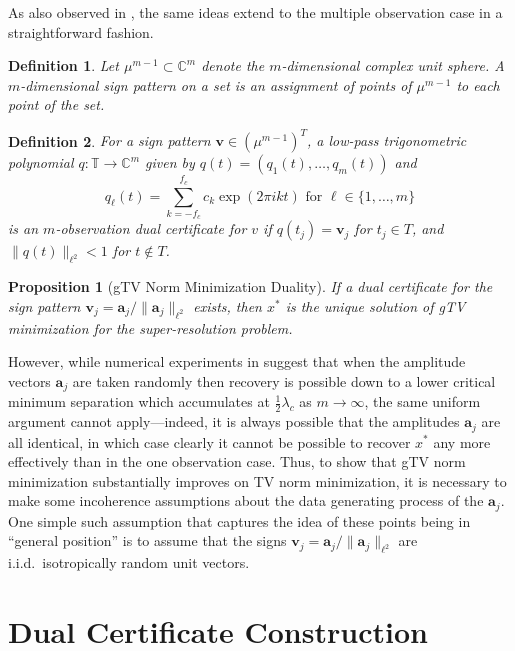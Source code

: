 \documentclass[11pt]{article}
\newcommand{\TT}{\mathbb{T}}
\newcommand{\CC}{\mathbb{C}}
\newcommand{\ba}{\bm a}
\newcommand{\bv}{\bm v}
\newtheorem{definition}{Definition}
\newtheorem{proposition}{Proposition}
\begin{document}
As also observed in \cite{fernandez2016super}, the same ideas extend to the multiple observation case in a straightforward fashion.
\begin{definition}
    Let $\mu^{m - 1} \subset \CC^m$ denote the $m$-dimensional complex unit sphere.
    A \emph{$m$-dimensional sign pattern} on a set is an assignment of points of $\mu^{m - 1}$ to each point of the set.
\end{definition}
\begin{definition}
    For a sign pattern $\bv \in (\mu^{m - 1})^T$, a low-pass trigonometric polynomial $q: \TT \to \CC^m$ given by $q(t) = (q_1(t), \dots, q_m(t))$ and
    \begin{equation}
        q_\ell(t) = \sum_{k = -f_c}^{f_c} c_k \exp(2\pi i k t) \text{ for } \ell \in \{1, \dots, m\}
    \end{equation}
    is an \emph{$m$-observation dual certificate} for $v$ if $q(t_j) = \bv_j$ for $t_j \in T$, and $\|q(t)\|_{\ell^2} < 1$ for $t \notin T$.
\end{definition}
\begin{proposition}[\textsf{gTV} Norm Minimization Duality]
    If a dual certificate for the sign pattern $\bv_j = \ba_{j} / \|\ba_{j}\|_{\ell^2}$ exists, then $x^*$ is the unique solution of \textsf{gTV} minimization for the super-resolution problem.
\end{proposition}
However, while numerical experiments in \cite{fernandez2016super} suggest that when the amplitude vectors $\ba_j$ are taken randomly then recovery is possible down to a lower critical minimum separation which accumulates at $\frac{1}{2}\lambda_c$ as $m \to \infty$, the same uniform argument cannot apply---indeed, it is always possible that the amplitudes $\ba_j$ are all identical, in which case clearly it cannot be possible to recover $x^*$ any more effectively than in the one observation case.
Thus, to show that \textsf{gTV} norm minimization substantially improves on \textsf{TV} norm minimization, it is necessary to make some incoherence assumptions about the data generating process of the $\ba_j$.
One simple such assumption that captures the idea of these points being in ``general position'' is to assume that the signs $\bv_j = \ba_j / \|\ba_j\|_{\ell^2}$ are i.i.d.\ isotropically random unit vectors.

\section{Dual Certificate Construction}
\end{document}
